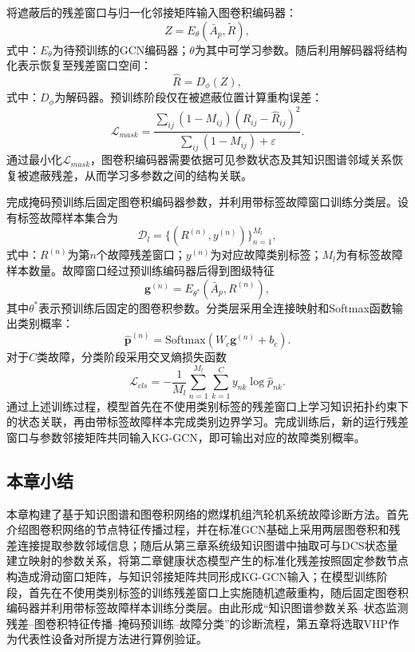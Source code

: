 将遮蔽后的残差窗口与归一化邻接矩阵输入图卷积编码器：
\begin{equation}
Z=E_{\theta}(\bar A_p,\tilde R),
\end{equation}
式中：$E_{\theta}$为待预训练的GCN编码器；$\theta$为其中可学习参数。随后利用解码器将结构化表示恢复至残差窗口空间：
\begin{equation}
\hat R=D_{\phi}(Z),
\end{equation}
式中：$D_{\phi}$为解码器。预训练阶段仅在被遮蔽位置计算重构误差：
\begin{equation}
\mathcal L_{mask}=\frac{\sum_{ij}(1-M_{ij})(R_{ij}-\hat R_{ij})^2}{\sum_{ij}(1-M_{ij})+\varepsilon}.
\end{equation}
通过最小化$\mathcal L_{mask}$，图卷积编码器需要依据可见参数状态及其知识图谱邻域关系恢复被遮蔽残差，从而学习多参数之间的结构关联。

完成掩码预训练后固定图卷积编码器参数，并利用带标签故障窗口训练分类层。设有标签故障样本集合为
\begin{equation}
\mathcal D_l=\{(R^{(n)},y^{(n)})\}_{n=1}^{M_l},
\end{equation}
式中：$R^{(n)}$为第$n$个故障残差窗口；$y^{(n)}$为对应故障类别标签；$M_l$为有标签故障样本数量。故障窗口经过预训练编码器后得到图级特征
\begin{equation}
\mathbf g^{(n)}=E_{\theta^*}(\bar A_p,R^{(n)}),
\end{equation}
其中$\theta^*$表示预训练后固定的图卷积参数。分类层采用全连接映射和Softmax函数输出类别概率：
\begin{equation}
\hat{\mathbf p}^{(n)}=\mathrm{Softmax}\left(W_c\mathbf g^{(n)}+b_c\right).
\end{equation}
对于$C$类故障，分类阶段采用交叉熵损失函数
\begin{equation}
\mathcal L_{cls}=-\frac{1}{M_l}\sum_{n=1}^{M_l}\sum_{k=1}^{C}y_{nk}\log \hat p_{nk}.
\end{equation}
通过上述训练过程，模型首先在不使用类别标签的残差窗口上学习知识拓扑约束下的状态关联，再由带标签故障样本完成类别边界学习。完成训练后，新的运行残差窗口与参数邻接矩阵共同输入KG-GCN，即可输出对应的故障类别概率。

\subsection{本章小结}

本章构建了基于知识图谱和图卷积网络的燃煤机组汽轮机系统故障诊断方法。首先介绍图卷积网络的节点特征传播过程，并在标准GCN基础上采用两层图卷积和残差连接提取参数邻域信息；随后从第三章系统级知识图谱中抽取可与DCS状态量建立映射的参数关系，将第二章健康状态模型产生的标准化残差按照固定参数节点构造成滑动窗口矩阵，与知识邻接矩阵共同形成KG-GCN输入；在模型训练阶段，首先在不使用类别标签的训练残差窗口上实施随机遮蔽重构，随后固定图卷积编码器并利用带标签故障样本训练分类层。由此形成“知识图谱参数关系--状态监测残差--图卷积特征传播--掩码预训练--故障分类”的诊断流程，第五章将选取VHP作为代表性设备对所提方法进行算例验证。
